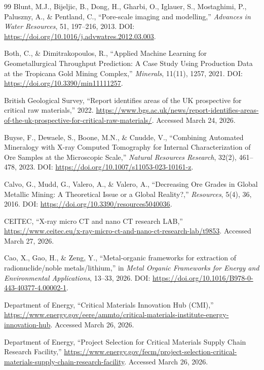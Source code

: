 \documentclass[12pt,a4paper]{article}
\begin{document}
\begin{thebibliography}{99}
Blunt, M.J., Bijeljic, B., Dong, H., Gharbi, O., Iglauer, S., Mostaghimi, P., Paluszny, A., \& Pentland, C., ``Pore-scale imaging and modelling,'' \textit{Advances in Water Resources}, 51, 197--216, 2013. DOI: \url{https://doi.org/10.1016/j.advwatres.2012.03.003}.

Both, C., \& Dimitrakopoulos, R., ``Applied Machine Learning for Geometallurgical Throughput Prediction: A Case Study Using Production Data at the Tropicana Gold Mining Complex,'' \textit{Minerals}, 11(11), 1257, 2021. DOI: \url{https://doi.org/10.3390/min11111257}.

British Geological Survey, ``Report identifies areas of the UK prospective for critical raw materials,'' 2022. \url{https://www.bgs.ac.uk/news/report-identifies-areas-of-the-uk-prospective-for-critical-raw-materials/}. Accessed March 24, 2026.

Buyse, F., Dewaele, S., Boone, M.N., \& Cnudde, V., ``Combining Automated Mineralogy with X-ray Computed Tomography for Internal Characterization of Ore Samples at the Microscopic Scale,'' \textit{Natural Resources Research}, 32(2), 461--478, 2023. DOI: \url{https://doi.org/10.1007/s11053-023-10161-z}.

Calvo, G., Mudd, G., Valero, A., \& Valero, A., ``Decreasing Ore Grades in Global Metallic Mining: A Theoretical Issue or a Global Reality?,'' \textit{Resources}, 5(4), 36, 2016. DOI: \url{https://doi.org/10.3390/resources5040036}.

CEITEC, ``X-ray micro CT and nano CT research LAB,'' \url{https://www.ceitec.eu/x-ray-micro-ct-and-nano-ct-research-lab/t9853}. Accessed March 27, 2026.

Cao, X., Gao, H., \& Zeng, Y., ``Metal-organic frameworks for extraction of radionuclide/noble metals/lithium,'' in \textit{Metal Organic Frameworks for Energy and Environmental Applications}, 13--33, 2026. DOI: \url{https://doi.org/10.1016/B978-0-443-40377-4.00002-1}.

Department of Energy, ``Critical Materials Innovation Hub (CMI),'' \url{https://www.energy.gov/eere/ammto/critical-materials-institute-energy-innovation-hub}. Accessed March 26, 2026.

Department of Energy, ``Project Selection for Critical Materials Supply Chain Research Facility,'' \url{https://www.energy.gov/fecm/project-selection-critical-materials-supply-chain-research-facility}. Accessed March 26, 2026.


\end{thebibliography}
\end{document}

